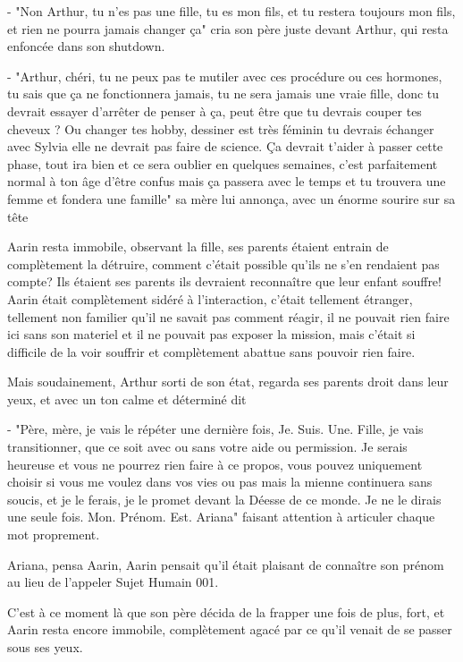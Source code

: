 \documentclass[12pt,hidelinks,a4paper]{book}
\begin{document}
- "Non Arthur, tu n'es pas une fille, tu es mon fils, et tu restera toujours mon fils, et rien ne pourra 
jamais changer ça" cria son père juste devant Arthur, qui resta enfoncée dans son shutdown.\par 
- "Arthur, chéri, tu ne peux pas te mutiler avec ces procédure ou ces hormones, tu sais que ça ne fonctionnera 
jamais, tu ne sera jamais une vraie fille, donc tu devrait essayer d'arrêter de penser à ça, peut être que tu 
devrais couper tes cheveux ? Ou changer tes hobby, dessiner est très féminin tu devrais échanger avec Sylvia elle ne 
devrait pas faire de science. Ça devrait t'aider à passer cette phase, tout ira bien et ce sera oublier en quelques semaines,
c'est parfaitement normal à ton âge d'être confus mais ça passera avec le temps et tu trouvera une femme et fondera une famille"
sa mère lui annonça, avec un énorme sourire sur sa tête \par 
\bigskip

Aarin resta immobile, observant la fille, ses parents étaient entrain de complètement la détruire, comment c'était possible 
qu'ils ne s'en rendaient pas compte? Ils étaient ses parents ils devraient reconnaître que leur enfant souffre! Aarin était 
complètement sidéré à l'interaction, c'était tellement étranger, tellement non familier qu'il ne savait pas comment réagir,
il ne pouvait rien faire ici sans son materiel et il ne pouvait pas exposer la mission, mais c'était si difficile de la voir 
souffrir et complètement abattue sans pouvoir rien faire.\par 
\bigskip

Mais soudainement, Arthur sorti de son état, regarda ses parents droit dans leur yeux, et avec un ton calme et déterminé dit\par
- "Père, mère, je vais le répéter une dernière fois, Je. Suis. Une. Fille, je vais transitionner, que ce soit avec ou sans votre
aide ou permission. Je serais heureuse et vous ne pourrez rien faire à ce propos, vous pouvez uniquement choisir si vous 
me voulez dans vos vies ou pas mais la mienne continuera sans soucis, et je le ferais, je le promet devant la Déesse de ce monde. 
Je ne le dirais une seule fois. Mon. Prénom. Est. Ariana" faisant attention à articuler chaque mot proprement.\par 
\bigskip

Ariana, pensa Aarin, Aarin pensait qu'il était plaisant de connaître son prénom au lieu de l'appeler Sujet Humain 001. \par 
\bigskip
C'est à ce moment là que son père décida de la frapper une fois de plus, fort, et Aarin resta encore immobile, complètement 
agacé par ce qu'il venait de se passer sous ses yeux.\par 
\bigskip
\end{document}
